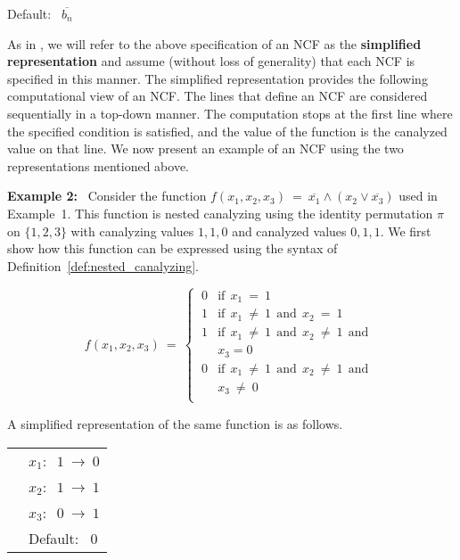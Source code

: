 \noindent
\hspace*{0.5in} Default:~ $\overline{b_n}$

\medskip
\noindent
As in \cite{Stearns-etal-2018}, we will refer to the above specification
of an NCF as the \textbf{simplified representation} and assume
(without loss of generality) that each NCF is specified in this manner.
The simplified representation provides the following 
computational view of an NCF. 
The lines that define an NCF are 
considered sequentially in a top-down manner.
The computation stops at the first line where the 
specified condition is satisfied, and the value of the function
is the canalyzed value on that line. 
We now present an example of an NCF using the two representations
mentioned above.


\medskip
\noindent
\textbf{Example 2:}~ Consider the function 
$f(x_1, x_2, x_3) ~=~ \overline{x_1} \wedge (x_2 \vee \overline{x_3})$
used in Example~1.
This function is nested canalyzing using the identity permutation $\pi$ on $\{1,2,3\}$
with canalyzing values $1,1,0$ and canalyzed values $0, 1, 1$.
We first show how this function can be expressed using the syntax of
Definition~\ref{def:nested_canalyzing}.

\[
f(x_1, x_2, x_3) ~=~ 
   \begin{cases}
       \:0 & \mathrm{if~~} x_{1} ~=~ 1 \\
       \:1 & \mathrm{if~~} x_{1} ~\neq~ 1 \mathrm{~~and~~}
            x_{2} ~=~ 1 \\
       \:1 & \mathrm{if~~} x_{1} ~\neq~ 1 \mathrm{~~and~~}
            x_{2} ~\neq~ 1 \mathrm{~~and~~}\\ 
           &x_{3} = 0 \\
       \:0 & \mathrm{if~~} x_{1} ~\neq~ 1 \mathrm{~~and~~} 
             x_{2} ~\neq~ 1 \mathrm{~~and~~}\\ 
           & x_{3} ~\neq~ 0 \\ 
   \end{cases}
\]

\medskip
\noindent
A simplified representation of the same function is as follows.

\bigskip

\noindent
\begin{tabular}{ll}
\hspace*{0.25in} & $x_1:~$  $1 ~\longrightarrow~ 0$ \\ [0.5ex]
\hspace*{0.25in} & $x_2:~$  $1 ~\longrightarrow~ 1$ \\ [0.5ex]
\hspace*{0.25in} & $x_3:~$  $0 ~\longrightarrow~ 1$ \\ [0.5ex]
\hspace*{0.25in} & Default:~ $0$ \\
\end{tabular}

